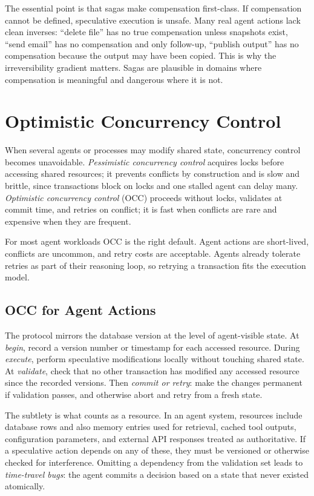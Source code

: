 \documentclass[11pt]{book}
\begin{document}
The essential point is that sagas make compensation first-class. If compensation cannot be defined, speculative execution is unsafe. Many real agent actions lack clean inverses: ``delete file'' has no true compensation unless snapshots exist, ``send email'' has no compensation and only follow-up, ``publish output'' has no compensation because the output may have been copied. This is why the irreversibility gradient matters. Sagas are plausible in domains where compensation is meaningful and dangerous where it is not.

\section{Optimistic Concurrency Control}

When several agents or processes may modify shared state, concurrency control becomes unavoidable. \emph{Pessimistic concurrency control} acquires locks before accessing shared resources; it prevents conflicts by construction and is slow and brittle, since transactions block on locks and one stalled agent can delay many. \emph{Optimistic concurrency control} (OCC) proceeds without locks, validates at commit time, and retries on conflict; it is fast when conflicts are rare and expensive when they are frequent.

For most agent workloads OCC is the right default. Agent actions are short-lived, conflicts are uncommon, and retry costs are acceptable. Agents already tolerate retries as part of their reasoning loop, so retrying a transaction fits the execution model.

\subsection{OCC for Agent Actions}

The protocol mirrors the database version at the level of agent-visible state. At \textit{begin}, record a version number or timestamp for each accessed resource. During \textit{execute}, perform speculative modifications locally without touching shared state. At \textit{validate}, check that no other transaction has modified any accessed resource since the recorded versions. Then \textit{commit or retry}: make the changes permanent if validation passes, and otherwise abort and retry from a fresh state.

The subtlety is what counts as a resource. In an agent system, resources include database rows and also memory entries used for retrieval, cached tool outputs, configuration parameters, and external API responses treated as authoritative. If a speculative action depends on any of these, they must be versioned or otherwise checked for interference. Omitting a dependency from the validation set leads to \textit{time-travel bugs}: the agent commits a decision based on a state that never existed atomically.
\end{document}
